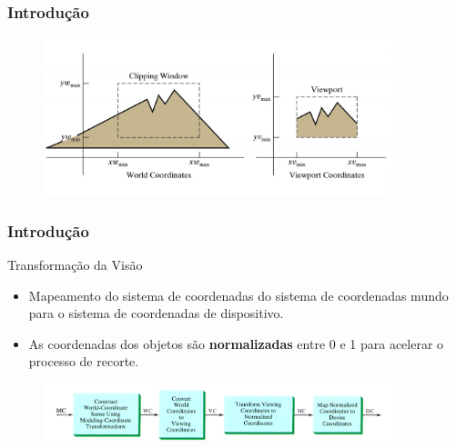 \documentclass{beamer}
\begin{document}
\begin{frame}
\frametitle{Introdução}

	\begin{figure}[!h]
			\begin{center}
			\includegraphics[width=0.9\textwidth]{Figures/CliWin}
			\end{center}
	\end{figure}	
\end{frame}


\begin{frame}
\frametitle{Introdução}

	\begin{block}{Transformação da Visão}
		\begin{itemize}
			\item Mapeamento do sistema de coordenadas do sistema de coordenadas mundo para o sistema de coordenadas de dispositivo.

			\item As coordenadas dos objetos são \textbf{normalizadas} entre 0 e 1 para acelerar o processo de recorte.
		\end{itemize}
		
	\end{block}
	\begin{figure}[!h]
				\begin{center}
					\includegraphics[width=0.9\textwidth]{Figures/ViePip}
				\end{center}
			\end{figure}	
\end{frame}
\end{document}
